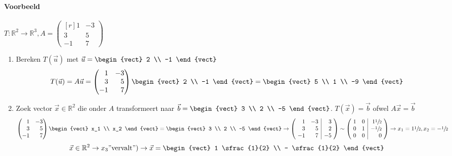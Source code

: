 \paragraph{Voorbeeld} $T: \mathbb{R}^2 \to \mathbb{R}^3, A = \begin{pmatrix*}[r]
	1 & -3 \\
	3 & 5 \\
	-1 & 7
\end{pmatrix*}$
\begin{enumerate}
	\item Bereken $T(\vec{u})$ met $\vec{u} = \begin{vect} 2 \\ -1 \end{vect}$
	\[ T(\vec{u}) = A \vec{u} = \begin{pmatrix*}[r]
	1 & -3 \\
	3 & 5 \\
	-1 & 7
\end{pmatrix*} \begin{vect} 2 \\ -1 \end{vect} = \begin{vect} 5 \\ 1 \\ -9 \end{vect} \]
	\item Zoek vector $\vec{x} \in \mathbb{R}^2$ die onder $A$ transformeert naar $\vec{b} = \begin{vect} 3 \\ 2 \\ -5 \end{vect}$. $T(\vec{x}) = \vec{b}$ ofwel $A \vec{x} = \vec{b}$
	\[ \begin{pmatrix*}[r]
	1 & -3 \\
	3 & 5 \\
	-1 & 7
\end{pmatrix*} \begin{vect} x_1 \\ x_2 \end{vect} = \begin{vect} 3 \\ 2 \\ -5 \end{vect} \to \left(\!\begin{array}{rr|r}
	1 & -3 & 3 \\
	3 & 5 & 2 \\
	-1 & 7 & -5
\end{array}\!\right) \sim \left(\!\begin{array}{rr|r}
	1 & 0 & 1\sfrac{1}{2} \\
	0 & 1 & -\sfrac{1}{2} \\
	0 & 0 & 0
\end{array}\!\right) \to x_1 = 1\sfrac{1}{2}, x_2 = -\sfrac{1}{2} \]
\[ \vec{x} \in \mathbb{R}^2 \to x_3 \mbox{''vervalt''}) \to \vec{x} = \begin{vect} 1 \sfrac{1}{2} \\ - \sfrac{1}{2} \end{vect} \]
\end{enumerate}

